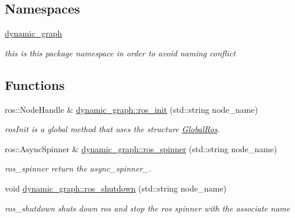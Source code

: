 \subsection*{Namespaces}
\begin{DoxyCompactItemize}
\item 
 \hyperlink{namespacedynamic__graph}{dynamic\+\_\+graph}
\begin{DoxyCompactList}\small\item\em this is this package namespace in order to avoid naming conflict \end{DoxyCompactList}\end{DoxyCompactItemize}
\subsection*{Functions}
\begin{DoxyCompactItemize}
\item 
ros\+::\+Node\+Handle \& \hyperlink{namespacedynamic__graph_ab01ece41a91a029cf335e28548cdfc06}{dynamic\+\_\+graph\+::ros\+\_\+init} (std\+::string node\+\_\+name)
\begin{DoxyCompactList}\small\item\em ros\+Init is a global method that uses the structure \hyperlink{structdynamic__graph_1_1GlobalRos}{Global\+Ros}. \end{DoxyCompactList}\item 
ros\+::\+Async\+Spinner \& \hyperlink{namespacedynamic__graph_a0ab97e95b56e05d30fd3112f8dfcf8eb}{dynamic\+\_\+graph\+::ros\+\_\+spinner} (std\+::string node\+\_\+name)
\begin{DoxyCompactList}\small\item\em ros\+\_\+spinner return the async\+\_\+spinner\+\_\+. \end{DoxyCompactList}\item 
\mbox{\label{namespacedynamic__graph_a0a7d6cd6c123bd1852af188fc06ce4f7}} 
void \hyperlink{namespacedynamic__graph_a0a7d6cd6c123bd1852af188fc06ce4f7}{dynamic\+\_\+graph\+::ros\+\_\+shutdown} (std\+::string node\+\_\+name)
\begin{DoxyCompactList}\small\item\em ros\+\_\+shutdown shuts down ros and stop the ros spinner with the associate name \end{DoxyCompactList}\item 
\mbox{\label{namespacedynamic__graph_a7d2045abc7e02fe4ee746c5cbb937b04}} 

\end{DoxyCompactItemize}
